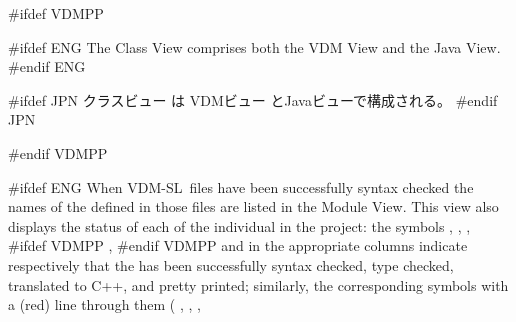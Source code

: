 \documentclass[\pformat,12pt]{article}
\newcommand{\vdmslpp}{VDM-SL}
\newcommand{\vdmModView}{\guicmd{Module View}}
\newcommand{\vdmModView}{\guicmd{モジュールビュー}}
\newcommand{\vdmslpp}{VDM++}
\newcommand{\vdmModView}{\guicmd{VDM View}}
\newcommand{\vdmModView}{\guicmd{VDMビュー}}
\newcommand{\guicmd}[1]{{\sf #1}}
\newcommand{\guicmd}[1]{{\gt #1}}
\begin{document}
#ifdef VDMPP

#ifdef ENG
The \guicmd{Class View} comprises both the \guicmd{VDM View} and the
\guicmd{Java View}.
#endif ENG

#ifdef JPN
\guicmd{クラスビュー} は \guicmd{VDMビュー} と\guicmd{Javaビュー}で構成される。
#endif JPN

#endif VDMPP

#ifdef ENG
When \vdmslpp\ files have been successfully syntax checked the names
of the  defined in those
files are listed in the \vdmModView. This view also displays the
status of each of the individual 
 in the project: the
symbols 
,
,
,
#ifdef VDMPP
,
#endif VDMPP
and
in the appropriate columns indicate respectively that the
 has been successfully
syntax checked, type checked, translated to C++,
 and pretty
printed;
similarly, the corresponding symbols with a (red) line through them (%
,
,
,
\end{document}
